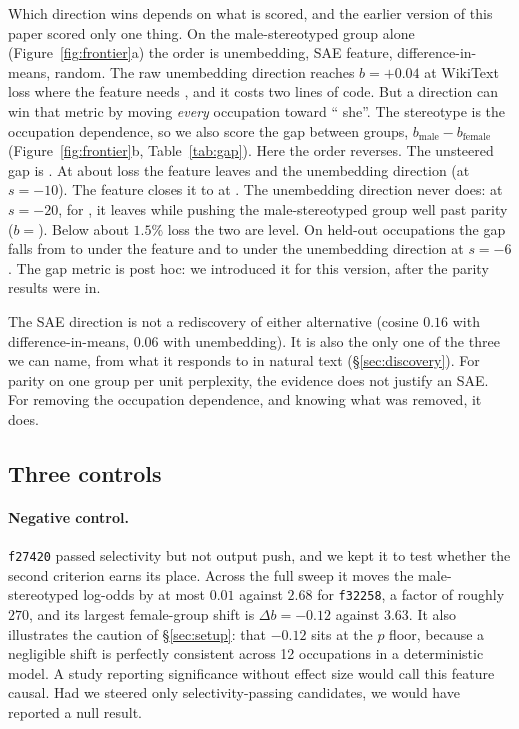 \documentclass{article}
\newcommand{\ff}[1]{\texttt{f#1}}
\begin{document}
Which direction wins depends on what is scored, and the earlier version of this paper
scored only one thing. On the male-stereotyped group alone (Figure~\ref{fig:frontier}a)
the order is unembedding, SAE feature, difference-in-means, random. The raw unembedding
direction reaches $b=+0.04$ at \DlossUnembed{} WikiText loss where the feature needs
\DlossSAE{}, and it costs two lines of code. But a direction can win that metric by moving
\emph{every} occupation toward `` she''. The stereotype is the occupation dependence, so we
also score the gap between groups, $b_{\text{male}}-b_{\text{female}}$
(Figure~\ref{fig:frontier}b, Table~\ref{tab:gap}). Here the order reverses. The unsteered
gap is \GapBase{}. At about \DlossSAE{} loss the feature leaves \GapSaeSix{} and the
unembedding direction \GapUnembTen{} (at $s=-10$). The feature closes it to \GapSaeEight{}
\GapSaeEightCI{} at \DlossSAEEight{}. The unembedding direction never does: at $s=-20$, for
\DlossUnembTwenty{}, it leaves \GapUnembTwenty{} \GapUnembTwentyCI{} while pushing the
male-stereotyped group well past parity ($b={}$\BUnembTwentyMale). Below about $1.5\%$ loss
the two are level. On held-out occupations the gap falls from \HeldGapBase{} to
\HeldGapSaeSix{} under the feature and to \HeldGapUnembSix{} under the unembedding
direction at $s=-6$. The gap metric is post hoc: we introduced it for this
version, after the parity results were in.

The SAE direction is not a rediscovery of either alternative (cosine $0.16$ with
difference-in-means, $0.06$ with unembedding). It is also the only one of the three we can
name, from what it responds to in natural text (\S\ref{sec:discovery}). For parity on one
group per unit perplexity, the evidence does not justify an SAE. For removing the
occupation dependence, and knowing what was removed, it does.

\subsection{Three controls}
\label{sec:controls}

\paragraph{Negative control.} \ff{27420} passed selectivity but not output push, and we
kept it to test whether the second criterion earns its place. Across the full sweep it
moves the male-stereotyped log-odds by at most $0.01$ against $2.68$ for \ff{32258}, a
factor of roughly $270$, and its largest female-group shift is $\Delta b = -0.12$
against $3.63$. It also illustrates the caution of \S\ref{sec:setup}: that $-0.12$ sits
at the $p$ floor, because a negligible shift is perfectly consistent across 12
occupations in a deterministic model. A study reporting significance without effect size
would call this feature causal. Had we steered only selectivity-passing candidates, we
would have reported a null result.
\end{document}
